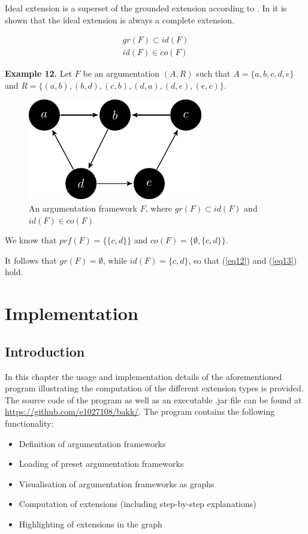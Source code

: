 \documentclass[draft,final]{vutinfth} %
\newcommand{\hl}{\par\vspace{6pt}} %
\newcommand{\cl}{\par\vspace{12pt}} %
\begin{document}
Ideal extension is a superset of the grounded extension according to \cite{Dung2}. In \cite{Baroni} it is shown that the ideal extension is always a complete extension.

\begin{align}
	\label{eq12} gr(F)\subset id(F)\\
	\label{eq13} id(F)\in co(F)
\end{align}\hl

\textbf{Example 12.} Let $F$ be an argumentation $(A,R)$ such that $A=\{a,b,c,d,e\}$ and $R=\{(a,b),(b,d),(c,b),(d,a),(d,e),(e,c)\}$.\hl

\FloatBarrier
	\begin{figure}[!h]
		\centering
		\includegraphics[scale=1.5]{graphs/ex6.pdf}
		\caption{An argumentation framework $F$, where $gr(F)\subset id(F)$ and $id(F)\in co(F)$}
	\end{figure}
\FloatBarrier

We know that $prf(F)=\{\{c,d\}\}$ and $co(F)=\{\emptyset,\{c,d\}\}$.\hl
It follows that $gr(F)=\emptyset$, while $id(F)=\{c,d\}$, so that (\ref{eq12}) and (\ref{eq13}) hold.\cl

\chapter{Implementation}

\section{Introduction}
In this chapter the usage and implementation details of the aforementioned program illustrating the computation of the different extension types is provided. The source code of the program as well as an executable .jar file can be found at \url{https://github.com/e1027108/bakk/}.  The program contains the following functionality:\hl

\begin{itemize}
\item Definition of argumentation frameworks
\item Loading of preset argumentation frameworks
\item Visualisation of argumentation frameworks as graphs
\item Computation of extensions (including step-by-step explanations)
\item Highlighting of extensions in the graph
\end{itemize}
\end{document}

